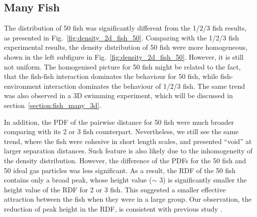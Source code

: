 \documentclass[11pt,twoside]{report}
\begin{document}
\subsection{Many Fish}
\label{section:fish_50_2d}

The distribution of 50 fish was significantly different from the 1/2/3 fish results, as presented in Fig.~\ref{fig:density_2d_fish_50}.
Comparing with the 1/2/3 fish experimental results, the density distribution of 50 fish were more homogeneous, shown in the left subfigure in Fig.~\ref{fig:density_2d_fish_50}. However, it is still not uniform. The homogenised picture for 50 fish might be related to the fact, that the fish-fish interaction dominates the behaviour for 50 fish, while fish-environment interaction dominates the behaviour of 1/2/3 fish. The same trend was also observed in a 3D swimming experiment, which will be discussed in section~\ref{section:fish_many_3d}.

In addition, the PDF of the pairwise distance for 50 fish were much broader comparing with its 2 or 3 fish counterpart. Nevertheless, we still see the same trend, where the fish were cohesive in short length scales, and presented ``void'' at larger separation distances. Such feature is also likely due to the inhomogeneity of the density distribution. However, the difference of the PDFs for the 50 fish and 50 ideal gas particles was less significant. As a result, the RDF of the 50 fish contains only a broad peak, whose height value ($\sim$ 3) is significantly smaller the height value of the RDF for 2 or 3 fish. This suggested a smaller effective attraction between the fish when they were in a large group. Our observation, the reduction of peak height in the RDF, is consistent with previous study \cite{romenskyy2017}.
\end{document}
